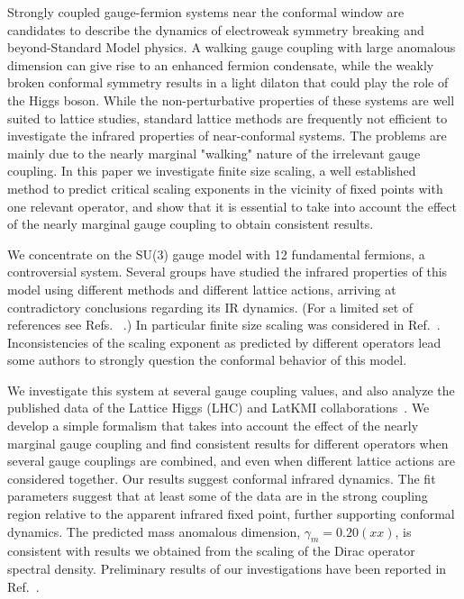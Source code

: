 \documentclass[aps,prl,twocolumn,]{revtex4}  %
\newcommand{\refcite}[1]{Ref.~\cite{#1}}
\begin{document}
Strongly coupled gauge-fermion systems near the conformal window are   candidates to describe the dynamics of electroweak symmetry breaking and beyond-Standard Model physics. A walking  gauge coupling  with large anomalous dimension can give rise to an enhanced fermion condensate,  while the weakly broken conformal symmetry results in a light dilaton that could play the role of the Higgs boson. While the  non-perturbative properties of these systems are well suited to lattice studies,   standard lattice methods are frequently not efficient to investigate the infrared properties of near-conformal systems. The problems are mainly due to  the nearly marginal "walking" nature of the irrelevant gauge coupling. In this paper we investigate finite size scaling, a well established method to predict critical scaling exponents in the vicinity of fixed points with one relevant operator, and show that it is essential to take into account the effect of the nearly marginal gauge coupling to obtain consistent results. 

We concentrate on the SU(3) gauge model with 12 fundamental fermions,
a controversial system.
Several groups have studied the infrared properties of this model using different methods and different lattice actions, arriving at contradictory conclusions regarding its IR dynamics.
(For a limited set of references see Refs.~\cite{Appelquist:2009ty, Deuzeman:2009mh, Hasenfratz:2011xn, Fodor:2011tu, Appelquist:2011dp,DeGrand:2011cu, Cheng:2011ic, Cheng:2013eu, Fodor:2012uw, Fodor:2012et,  Aoki:2012eq, Aoki:2013pca, Itou:2012qn, Lin:2012iw, Jin:2012dw} .) In particular finite size scaling was considered in \refcite{Fodor:2011tu,Appelquist:2011dp,DeGrand:2011cu,Fodor:2012et,Aoki:2012eq}. Inconsistencies of the scaling exponent as predicted by different operators lead some authors to strongly question the conformal  behavior of this model.

We investigate this system at several gauge coupling values, and  also analyze the published data of the Lattice Higgs (LHC) and LatKMI collaborations~\cite{Fodor:2011tu,Aoki:2012eq}. We develop a simple  formalism that  takes into account the effect of the nearly marginal gauge coupling and find consistent results for different operators  when several gauge couplings are combined, and even when different lattice actions are considered together. Our results suggest conformal infrared dynamics. The fit parameters suggest that at least some of the data are in the strong coupling region relative to the apparent infrared fixed point, further supporting conformal dynamics. The predicted mass anomalous dimension, $\gamma_m=0.20(xx)$, is consistent with results we obtained from the scaling of the Dirac operator spectral density. Preliminary results of our investigations have been reported in \refcite{Hasenfratz:2013eka}.
\end{document}

